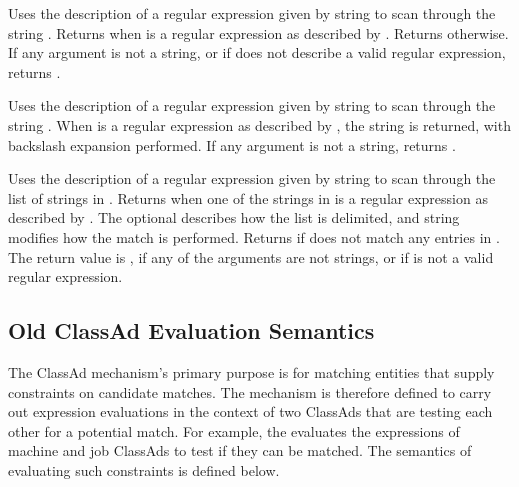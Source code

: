\begin{description}
  \item[\Code{Boolean regexp(String pattern, String target \Lbr\ , String options \Rbr)}]
    Uses the description of a regular expression 
    given by string 
    to scan through the string .
    Returns  when  is 
    a regular expression as described by .
    Returns  otherwise.
    If any argument is not a string, or if  does not describe
    a valid regular expression, returns .

  \item[\Code{String regexps}]  
    Uses the description of a regular expression 
    given by string 
    to scan through the string .
    When  is a regular expression
    as described by ,
    the string  is returned,
    with backslash expansion performed.
    If any argument is not a string, returns .

  \item[\Code{Boolean stringList\_regexpMember}]
    Uses the description of a regular expression 
    given by string 
    to scan through the list of strings in .
    Returns  when one of the strings in  is 
    a regular expression as described by .
    The optional  describes how the list is delimited,
    and string  modifies how the match is performed.
    Returns  if  does not match any entries in
    .
    The return value is , if any of the arguments
    are not strings, or if  is not a valid regular expression.

\end{description}


\subsection{Old ClassAd Evaluation Semantics}
\label{ClassAd:evaluation}
The ClassAd mechanism's primary purpose is for matching entities that supply
constraints on candidate matches.  The mechanism is therefore defined to
carry out expression evaluations in the context of two ClassAds that are
testing each other for a potential match.  For example, the 
evaluates the  expressions of machine and job ClassAds to
test if they can be matched.  The semantics of evaluating such constraints
is defined below.

